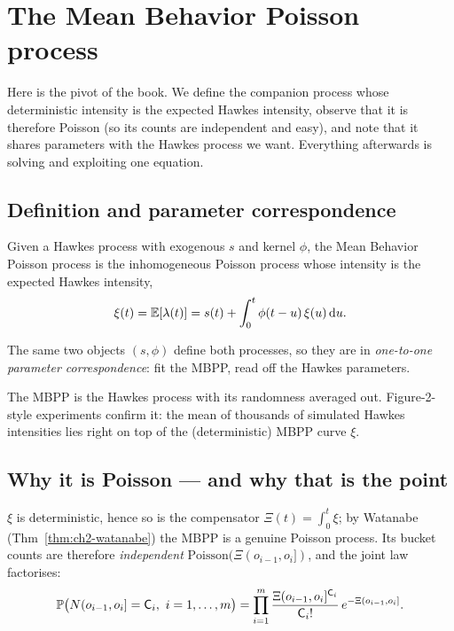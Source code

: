 \chapter{The Mean Behavior Poisson process}
\label{ch:mbpp}

\begin{motivation}
Here is the pivot of the book. We define the companion process whose deterministic
intensity is the expected Hawkes intensity, observe that it is therefore Poisson
(so its counts are independent and easy), and note that it shares parameters with
the Hawkes process we want. Everything afterwards is solving and exploiting one
equation.
\end{motivation}

\section{Definition and parameter correspondence}

\begin{definition}[MBPP]\label{def:ch4-mbpp}
Given a Hawkes process with exogenous $s$ and kernel $\phi$, the Mean Behavior
Poisson process is the inhomogeneous Poisson process whose intensity is the
expected Hawkes intensity,
\begin{equation}
\xi(t)=\mathbb{E}[\lambda(t)]=s(t)+\int_0^t\phi(t-u)\,\xi(u)\,\mathrm{d} u .
\label{eq:ch4-mbpp}
\end{equation}
\end{definition}

The same two objects $(s,\phi)$ define both processes, so they are in
\emph{one-to-one parameter correspondence}: fit the MBPP, read off the Hawkes
parameters.

\begin{intuitionbox}
The MBPP is the Hawkes process with its randomness averaged out. Figure-2-style
experiments confirm it: the mean of thousands of simulated Hawkes intensities lies
right on top of the (deterministic) MBPP curve $\xi$.
\end{intuitionbox}

\section{Why it is Poisson --- and why that is the point}

$\xi$ is deterministic, hence so is the compensator $\Xi(t)=\int_0^t\xi$; by
Watanabe (Thm~\ref{thm:ch2-watanabe}) the MBPP is a genuine Poisson process. Its
bucket counts are therefore \emph{independent}
$\mathrm{Poisson}(\Xi(o_{i-1},o_i])$, and the joint law factorises:
\begin{equation}
\Prob\big(N(o_{i-1},o_i]=\sfont C_i,\ i=1,\dots,m\big)
=\prod_{i=1}^m \frac{\Xi(o_{i-1},o_i]^{\sfont C_i}}{\sfont C_i!}\,e^{-\Xi(o_{i-1},o_i]} .
\end{equation}

